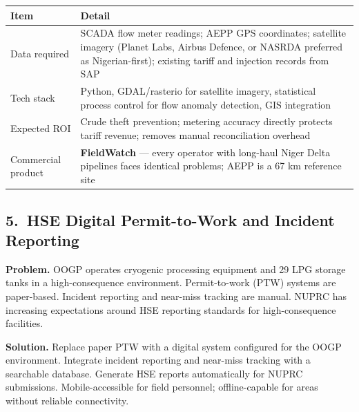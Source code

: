 \documentclass[10pt]{article}
\begin{document}
\vspace{4pt}
\small
\begin{tabularx}{\columnwidth}{@{}lX@{}}
\toprule
\textbf{Item} & \textbf{Detail} \\
\midrule
Data required     & SCADA flow meter readings; AEPP GPS coordinates; satellite imagery
                    (Planet Labs, Airbus Defence, or NASRDA preferred as Nigerian-first);
                    existing tariff and injection records from SAP \\
Tech stack        & Python, GDAL/rasterio for satellite imagery, statistical process
                    control for flow anomaly detection, GIS integration \\
Expected ROI      & Crude theft prevention; metering accuracy directly protects tariff
                    revenue; removes manual reconciliation overhead \\
Commercial product & \textbf{FieldWatch} --- every operator with long-haul Niger Delta
                    pipelines faces identical problems; AEPP is a 67 km reference site \\
\bottomrule
\end{tabularx}
\normalsize

\vspace{8pt}

\subsection*{5.\ HSE Digital Permit-to-Work and Incident Reporting}

{\small
\textbf{Problem.}
OOGP operates cryogenic processing equipment and 29 LPG storage tanks in a
high-consequence environment. Permit-to-work (PTW) systems are paper-based.
Incident reporting and near-miss tracking are manual. NUPRC has increasing
expectations around HSE reporting standards for high-consequence facilities.

\vspace{4pt}
\textbf{Solution.}
Replace paper PTW with a digital system configured for the OOGP environment.
Integrate incident reporting and near-miss tracking with a searchable database.
Generate HSE reports automatically for NUPRC submissions. Mobile-accessible for
field personnel; offline-capable for areas without reliable connectivity.
}
\end{document}
